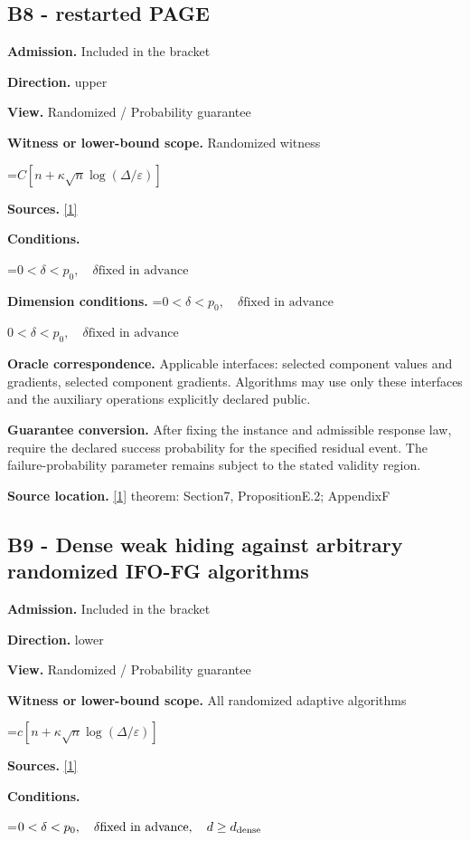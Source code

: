 \documentclass[10pt,a4paper]{article}
\newcommand{\AtlasMath}[1]{\par\begingroup\centering\setbox0=\hbox{$\displaystyle #1$}\ifdim\wd0>1.4\linewidth\typeout{ATLAS WIDE FORMULA: \the\wd0}\fi\ifdim\wd0>\linewidth\resizebox{\linewidth}{!}{\box0}\else\box0\fi\par\endgroup}
\newcommand{\AtlasInlineMath}[1]{\begingroup\setbox0=\hbox{$#1$}\ifdim\wd0>.4\linewidth\endgroup\AtlasMath{#1}\else\endgroup$#1$\fi}
\begin{document}
\subsection{B8 - restarted PAGE}
\textbf{Admission.} Included in the bracket

\textbf{Direction.} upper

\textbf{View.} Randomized / Probability guarantee

\textbf{Witness or lower-bound scope.} Randomized witness

\AtlasMath{C[n+\kappa\sqrt n\log(\Delta/\varepsilon)]}
\textbf{Sources.} \href{https://arxiv.org/pdf/2609.00045v3}{[1]}

\textbf{Conditions.} 
\AtlasMath{0<\delta<p_0,\quad\delta\text{fixed in advance}}


\textbf{Dimension conditions.} \AtlasInlineMath{0<\delta<p_0,\quad\delta\text{fixed in advance}}

\textbf{Oracle correspondence.} Applicable interfaces: selected component values and gradients, selected component gradients. Algorithms may use only these interfaces and the auxiliary operations explicitly declared public.

\textbf{Guarantee conversion.} After fixing the instance and admissible response law, require the declared success probability for the specified residual event. The failure-probability parameter remains subject to the stated validity region.

\textbf{Source location.} \href{https://arxiv.org/pdf/2609.00045v3}{[1]} theorem: Section7, PropositionE.2; AppendixF

\subsection{B9 - Dense weak hiding against arbitrary randomized IFO-FG algorithms}
\textbf{Admission.} Included in the bracket

\textbf{Direction.} lower

\textbf{View.} Randomized / Probability guarantee

\textbf{Witness or lower-bound scope.} All randomized adaptive algorithms

\AtlasMath{c[n+\kappa\sqrt n\log(\Delta/\varepsilon)]}
\textbf{Sources.} \href{https://arxiv.org/pdf/2609.00045v3}{[1]}

\textbf{Conditions.} 
\AtlasMath{0<\delta<p_0,\quad\delta\text{fixed in advance},\quad d\ge d_{\rm dense}}
\end{document}
